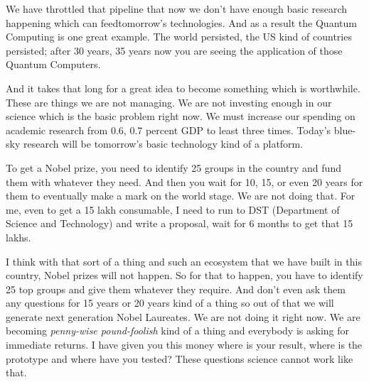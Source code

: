 \begin{multicols}{2}
We have throttled that pipeline that now we don’t have enough basic research happening which can feed\break tomorrow’s technologies. And as a result the Quantum Computing is one great example. The world persisted, the US kind of countries persisted; after 30 years, 35 years now you are seeing the application of those Quantum Computers.

And it takes that long for a great idea to become something which is worthwhile. These are things we are not managing. We are not investing enough in our science which is the basic problem right now. We must increase our spending on academic research from 0.6, 0.7 percent GDP to least three times. Today’s blue-sky research will be tomorrow’s basic technology kind of a platform.

To get a Nobel prize, you need to identify 25 groups in the country and fund them with whatever they need. And then you wait for 10, 15, or even 20 years for them to eventually make a mark on the world stage. We are not doing that. For me, even to get a 15 lakh consumable, I need to run to DST (Department of Science and Technology) and write a proposal, wait for 6 months to get that 15 lakhs.

I think with that sort of a thing and such an ecosystem that we have built in this country, Nobel prizes will not happen. So for that to happen, you have to identify 25 top groups and give them whatever they require. And don’t even ask them any questions for 15 years or 20 years kind of a thing so out of that we will generate next generation Nobel Laureates. We are not doing it right now. We are becoming \textit{penny-wise pound-foolish} kind of a thing and everybody is asking for immediate returns. I have given you this money where is your result, where is the prototype and where have you tested? These questions science cannot work like that.\hfill {}
\end{multicols}
